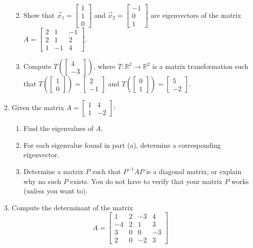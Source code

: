 \documentclass[12pt]{article}
\newcommand{\points}[1]{\marginpar{\hspace{24pt}[#1]}}
\newcommand{\R}{\mathbb{R}}
\newcommand{\bbm}{\begin{bmatrix}}
\newcommand{\ebm}{\end{bmatrix}}
\begin{document}
\begin{enumerate}
\begin{enumerate}
\vspace{2.5in}

 \item Show that $\vec{x}_1 = \bbm 1\\1\\0\ebm$ and $\vec{x}_2=\bbm -1\\0\\1\ebm$ are eigenvectors of the matrix $A=\bbm 2&1&-1\\2&1&2\\1&-1&4\ebm$.\points{4}

\vspace{2.5in}

 \item Compute $T\left(\bbm 4\\-3\ebm\right)$, where $T:\R^2\to \R^2$ is a matrix transformation such that $T\left(\bbm 1\\0\ebm\right) = \bbm 2\\-1\ebm$ and $T\left(\bbm 0\\1\ebm\right) = \bbm 5\\-2\ebm$. \points{2}

\end{enumerate}
\newpage

\item Given the matrix $A = \bbm 1&4\\1&-2\ebm$:
\begin{enumerate}
 \item Find the eigenvalues of $A$. \points{3}

\vspace{2in}

 \item For each eigenvalue found in part (a), determine a corresponding eigenvector. \points{6}

\vspace{4.25in}

 \item Determine a matrix $P$ such that $P^{-1}AP$ is a diagonal matrix, or explain why no such $P$ exists. \points{1} You do not have to verify that your matrix $P$ works (unless you want to).
\end{enumerate}


\newpage

\item Compute the determinant of the matrix \points{6}
\[
 A = \bbm 1&2&-3&4\\-4&2&1&3\\3&0&0&-3\\2&0&-2&3\ebm
\]


\end{enumerate}
\end{document}
